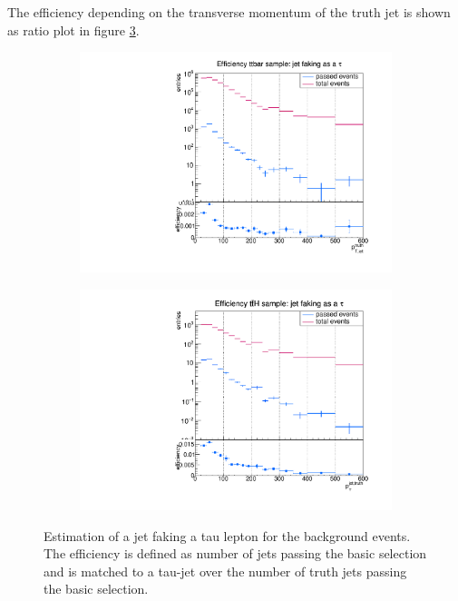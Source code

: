 The efficiency depending on the transverse momentum of the truth jet is shown as ratio plot in figure \ref{DividedJet:bg}.
%
\begin{figure}
  \centering
                \begin{subfigure}[t]{0.49\textwidth}
                \includegraphics[width=\textwidth]{figures/plots/ttbar/Divided_Jet.pdf}
                \label{DividedJet:bg:ttbar}
                \end{subfigure}
                \begin{subfigure}[t]{0.49\textwidth}
                \includegraphics[width=\textwidth]{figures/plots/ttH/Divided_Jet.pdf}
                \label{DividedJet:bg:ttH}
                \end{subfigure}        
\caption[Estimation of a jet faking a tau lepton for the background events.]{Estimation of a jet faking a tau lepton for the background events. The efficiency is defined as number of jets passing the basic selection and is matched to a tau-jet over the number of truth jets passing the basic selection.}
\label{DividedJet:bg}
\end{figure}
